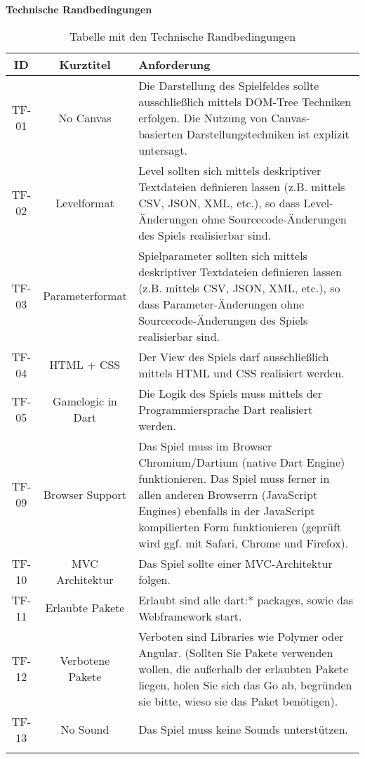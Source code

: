 \documentclass[a4paper,10pt]{report}
\begin{document}
{		\newpage
		\noindent \hspace{4mm}
		\textbf{Technische Randbedingungen}
		
		\begin{longtable}{|c|c|p{}|}
		\hline
		\textbf{ID} & \textbf{Kurztitel} & \textbf{Anforderung} \\
		\hline
		TF-01 & No Canvas 		& 	Die Darstellung des Spielfeldes sollte ausschließlich mittels DOM-Tree Techniken erfolgen. 
									Die Nutzung von Canvas-basierten Darstellungstechniken ist explizit untersagt. \\
		\hline
		TF-02 & Levelformat 	& 	Level sollten sich mittels deskriptiver Textdateien definieren lassen (z.B. mittels CSV, JSON, XML, etc.), 
									so dass Level-Änderungen ohne Sourcecode-Änderungen des Spiels realisierbar sind. \\
		\hline
		TF-03 & Parameterformat & 	Spielparameter sollten sich mittels deskriptiver Textdateien definieren lassen (z.B. mittels CSV, JSON, XML, etc.), 
									so dass Parameter-Änderungen ohne Sourcecode-Änderungen des Spiels realisierbar sind. \\
		\hline
		TF-04 & HTML + CSS 		& 	Der View des Spiels darf ausschließlich mittels HTML und CSS realisiert werden. \\
		\hline
		TF-05 & Gamelogic in Dart & Die Logik des Spiels muss mittels der Programmiersprache Dart realisiert werden. \\
		\hline
		TF-09 & Browser Support & 	Das Spiel muss im Browser Chromium/Dartium (native Dart Engine) funktionieren. 
									Das Spiel muss ferner in allen anderen Browserrn (JavaScript Engines) ebenfalls in 
									der JavaScript kompilierten Form funktionieren (geprüft wird ggf. mit Safari, Chrome und Firefox). \\
		\hline
		TF-10 & MVC Architektur & 	Das Spiel sollte einer MVC-Architektur folgen. \\
		\hline
		TF-11 & Erlaubte Pakete & 	Erlaubt sind alle dart:* packages, sowie das Webframework start. \\
		\hline
		TF-12 & Verbotene Pakete & 	Verboten sind Libraries wie Polymer oder Angular. (Sollten Sie Pakete verwenden wollen, die außerhalb der erlaubten
									Pakete liegen, holen Sie sich das Go ab, begründen sie bitte, wieso sie das Paket benötigen). \\
		\hline
		TF-13 & No Sound & Das Spiel muss keine Sounds unterstützen. \\
		\hline
		\caption{Tabelle mit den Technische Randbedingungen}
		\end{longtable}
	}    
    
\end{document}
